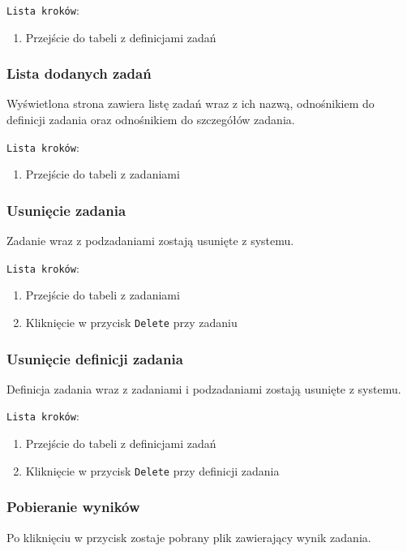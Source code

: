 \documentclass[a4paper,11pt,twoside]{report}
\theoremstyle{definition}
\begin{document}
				\texttt{Lista kroków}:
				\begin{enumerate}
	            	\item Przejście do tabeli z definicjami zadań
				\end{enumerate}

    		\subsubsection{Lista dodanych zadań}	
				Wyświetlona strona zawiera listę zadań wraz z ich nazwą, odnośnikiem do definicji zadania oraz odnośnikiem do szczegółów zadania.
				
				\texttt{Lista kroków}:
				\begin{enumerate}
					\item Przejście do tabeli z zadaniami
				\end{enumerate}

    		\subsubsection{Usunięcie zadania}	
				Zadanie wraz z podzadaniami zostają usunięte z systemu.
				
				\texttt{Lista kroków}:
				\begin{enumerate}
					\item Przejście do tabeli z zadaniami
					\item Kliknięcie w przycisk \texttt{Delete} przy zadaniu
				\end{enumerate}

    		\subsubsection{Usunięcie definicji zadania}	
    			Definicja zadania wraz z zadaniami i podzadaniami zostają usunięte z systemu.
    			
				\texttt{Lista kroków}:
				\begin{enumerate}
					\item Przejście do tabeli z definicjami zadań
					\item Kliknięcie w przycisk \texttt{Delete} przy definicji zadania
				\end{enumerate}

    		\subsubsection{Pobieranie wyników}	
				Po kliknięciu w przycisk zostaje pobrany plik zawierający
				wynik zadania.
				
\end{document}
